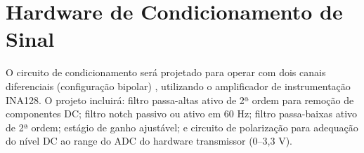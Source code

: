 \section{Hardware de Condicionamento de Sinal}
O circuito de condicionamento será projetado para operar com dois canais diferenciais (configuração bipolar) \cite{Krasoulis2020Multi}, utilizando o amplificador de instrumentação INA128. O projeto incluirá: filtro passa-altas ativo de 2ª ordem para remoção de componentes DC; filtro notch passivo ou ativo em 60 Hz; filtro passa-baixas ativo de 2ª ordem; estágio de ganho ajustável; e circuito de polarização para adequação do nível DC ao range do ADC do hardware transmissor (0–3,3 V).